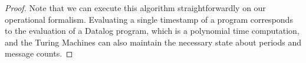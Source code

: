 \begin{proof}
Note that we can execute this algorithm straightforwardly on our operational formalism.  Evaluating a single timestamp of a \lang program corresponds to the evaluation of a Datalog program, which is a polynomial time computation, and the Turing Machines can also maintain the necessary state about periods and message counts.
\end{proof}


